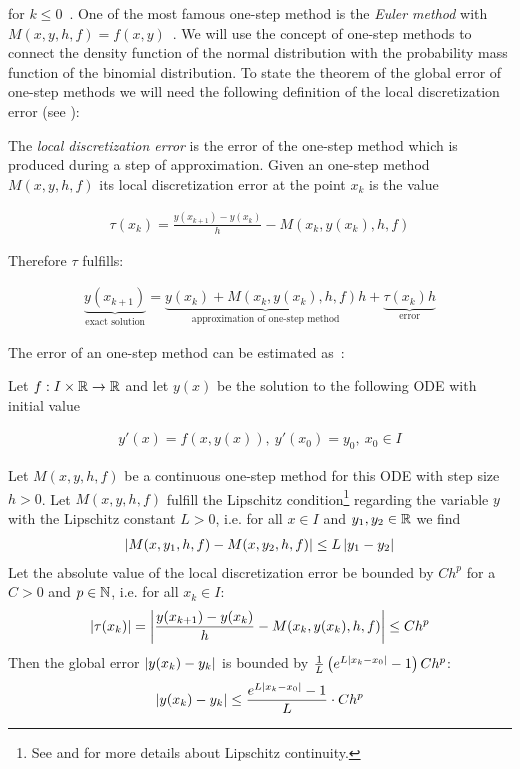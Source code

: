 for $k \le 0$~\cite[p. 473]{stoer}. One of the most famous one-step method is the \emph{Euler method} with $M(x,y,h,f) = f(x,y)$~\cite[p. 473]{stoer}. We will use the concept of one-step methods to connect the density function of the normal distribution with the probability mass function of the binomial distribution. To state the theorem of the global error of one-step methods we will need the following definition of the local discretization error (see \cite[pp. 473-474]{stoer}):

\begin{definition}
  The \emph{local discretization error} is the error of the one-step method which is produced during a step of approximation. Given an one-step method $M(x,y,h,f)$ its local discretization error at the point $x_k$ is the value

  \begin{align}
    \tau(x_k) = \frac{y(x_{k+1})-y(x_k)}h - M(x_k,y(x_k),h,f)
  \end{align}
\end{definition}

\noindent Therefore $\tau$ fulfills:

\begin{align}
  \underbrace{y(x_{k+1})}_{\text{exact solution}} = \underbrace{y(x_k) + M(x_k,y(x_k),h,f)h}_{\text{approximation of one-step method}} + \underbrace{\tau(x_k)h}_{\text{error}}
\end{align}

\noindent The error of an one-step method can be estimated as~\cite[pp. 478-479]{stoer}:

\begin{theorem} \label{thm:ode_global_error}
  Let $f:I\times \mathbb R\to\mathbb R$ and let $y(x)$ be the solution to the following ODE with initial value

  \begin{align}
    y'(x)=f(x,y(x)),\ y'(x_0)=y_0,\ x_0 \in I
  \end{align}

  Let $M(x,y,h,f)$ be a continuous one-step method for this ODE with step size $h > 0$. Let $M(x,y,h,f)$ fulfill the Lipschitz condition\footnote{See \cite[p. 467]{stoer} and \cite{wiki:lipschitz} for more details about Lipschitz continuity.} regarding the variable $y$ with the Lipschitz constant $L > 0$, i.e. for all $x\in I$ and $y_1,y_2\in\mathbb R$ we find
  \begin{align}
    \left|{M(x,y_1,h,f)-M(x,y_2,h,f)}\right| \le L \left|{y_1-y_2}\right|
  \end{align}
  Let the absolute value of the local discretization error be bounded by $C h^p$ for a $C > 0$ and $p\in \mathbb N$, i.e. for all $x_k \in I$:
  \begin{align}
    \left|{\tau(x_k)}\right| = \left|{\frac{y(x_{k+1})-y(x_k)}h - M(x_k,y(x_k),h,f)}\right| \le Ch^p
  \end{align}
  Then the global error $\left|{y(x_k)-y_k}\right|$ is bounded by $\frac 1L \left( {e^{L\left|{x_k-x_0}\right|}-1} \right) C h^p$:
  \begin{align}
    \left|{y(x_k)-y_k}\right| \le \frac{e^{L\left|{x_k-x_0}\right|}-1}{L} \cdot Ch^p
  \end{align}
\end{theorem}

